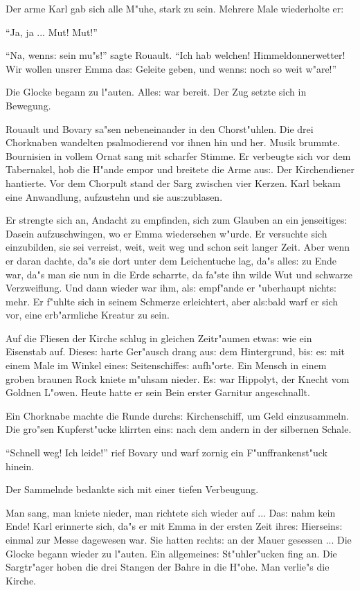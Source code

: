 \documentclass[oneside,12pt]{book}
\newcommand{\s}{s:}%
\begin{document}
Der arme Karl gab sich alle M"uhe, stark zu sein. Mehrere Male
wiederholte er:

"`Ja, ja ... Mut! Mut!"'

"`Na, wenn{\s} sein mu"s!"' sagte Rouault. "`Ich hab welchen!
Himmeldonnerwetter! Wir wollen unsrer Emma da{\s} Geleite geben,
und wenn{\s} noch so weit w"are!"'

Die Glocke begann zu l"auten. Alle{\s} war bereit. Der Zug setzte sich
in Bewegung.

Rouault und Bovary sa"sen nebeneinander in den Chorst"uhlen. Die
drei Chorknaben wandelten psalmodierend vor ihnen hin und her.
Musik brummte. Bournisien in vollem Ornat sang mit scharfer
Stimme. Er verbeugte sich vor dem Tabernakel, hob die H"ande empor
und breitete die Arme au{\s}. Der Kirchendiener hantierte. Vor dem
Chorpult stand der Sarg zwischen vier Kerzen. Karl bekam eine
Anwandlung, aufzustehn und sie au{\s}zublasen.

Er strengte sich an, Andacht zu empfinden, sich zum Glauben an ein
jenseitige{\s} Dasein aufzuschwingen, wo er Emma wiedersehen
w"urde. Er versuchte sich einzubilden, sie sei verreist, weit,
weit weg und schon seit langer Zeit. Aber wenn er daran dachte,
da"s sie dort unter dem Leichentuche lag, da"s alle{\s} zu Ende
war, da"s man sie nun in die Erde scharrte, da fa"ste ihn wilde
Wut und schwarze Verzweiflung. Und dann wieder war ihm, al{\s}
empf"ande er "uberhaupt nicht{\s} mehr. Er f"uhlte sich in seinem
Schmerze erleichtert, aber al{\s}bald warf er sich vor, eine
erb"armliche Kreatur zu sein.

Auf die Fliesen der Kirche schlug in gleichen Zeitr"aumen etwa{\s}
wie ein Eisenstab auf. Diese{\s} harte Ger"ausch drang au{\s} dem
Hintergrund, bi{\s} e{\s} mit einem Male im Winkel eine{\s}
Seitenschiffe{\s} aufh"orte. Ein Mensch in einem groben braunen
Rock kniete m"uhsam nieder. E{\s} war Hippolyt, der Knecht vom
Goldnen L"owen. Heute hatte er sein Bein erster Garnitur
angeschnallt.

Ein Chorknabe machte die Runde durch{\s} Kirchenschiff, um Geld
einzusammeln. Die gro"sen Kupferst"ucke klirrten ein{\s} nach dem
andern in der silbernen Schale.

"`Schnell weg! Ich leide!"' rief Bovary und warf zornig ein
F"unf\/frankenst"uck hinein.

Der Sammelnde bedankte sich mit einer tiefen Verbeugung.

Man sang, man kniete nieder, man richtete sich wieder auf ...
Da{\s} nahm kein Ende! Karl erinnerte sich, da"s er mit Emma in
der ersten Zeit ihre{\s} Hiersein{\s} einmal zur Messe dagewesen
war. Sie hatten recht{\s} an der Mauer gesessen ... Die Glocke
begann wieder zu l"auten. Ein allgemeine{\s} St"uhler"ucken fing
an. Die Sargtr"ager hoben die drei Stangen der Bahre in die H"ohe.
Man verlie"s die Kirche.
\end{document}
